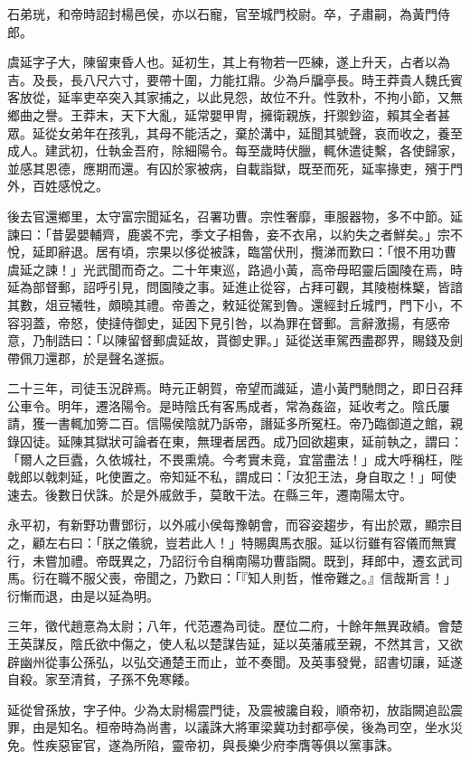 \begin{pinyinscope}
石弟珖，和帝時詔封楊邑侯，亦以石寵，官至城門校尉。卒，子肅嗣，為黃門侍郎。

虞延字子大，陳留東昏人也。延初生，其上有物若一匹練，遂上升天，占者以為吉。及長，長八尺六寸，要帶十圍，力能扛鼎。少為戶牖亭長。時王莽貴人魏氏賓客放從，延率吏卒突入其家捕之，以此見怨，故位不升。性敦朴，不拘小節，又無鄉曲之譽。王莽末，天下大亂，延常嬰甲冑，擁衛親族，扞禦鈔盜，賴其全者甚眾。延從女弟年在孩乳，其母不能活之，棄於溝中，延聞其號聲，哀而收之，養至成人。建武初，仕執金吾府，除細陽令。每至歲時伏臘，輒休遣徒繫，各使歸家，並感其恩德，應期而還。有囚於家被病，自載詣獄，既至而死，延率掾吏，殯于門外，百姓感悅之。

後去官還鄉里，太守富宗聞延名，召署功曹。宗性奢靡，車服器物，多不中節。延諫曰：「昔晏嬰輔齊，鹿裘不完，季文子相魯，妾不衣帛，以約失之者鮮矣。」宗不悅，延即辭退。居有頃，宗果以侈從被誅，臨當伏刑，攬涕而歎曰：「恨不用功曹虞延之諫！」光武聞而奇之。二十年東巡，路過小黃，高帝母昭靈后園陵在焉，時延為部督郵，詔呼引見，問園陵之事。延進止從容，占拜可觀，其陵樹株櫱，皆諳其數，俎豆犧牲，頗曉其禮。帝善之，敕延從駕到魯。還經封丘城門，門下小，不容羽蓋，帝怒，使撻侍御史，延因下見引咎，以為罪在督郵。言辭激揚，有感帝意，乃制誥曰：「以陳留督郵虞延故，貰御史罪。」延從送車駕西盡郡界，賜錢及劍帶佩刀還郡，於是聲名遂振。

二十三年，司徒玉況辟焉。時元正朝賀，帝望而識延，遣小黃門馳問之，即日召拜公車令。明年，遷洛陽令。是時陰氏有客馬成者，常為姦盜，延收考之。陰氏屢請，獲一書輒加篣二百。信陽侯陰就乃訴帝，譖延多所冤枉。帝乃臨御道之館，親錄囚徒。延陳其獄狀可論者在東，無理者居西。成乃回欲趨東，延前執之，謂曰：「爾人之巨蠹，久依城社，不畏熏燒。今考實未竟，宜當盡法！」成大呼稱枉，陛戟郎以戟刺延，叱使置之。帝知延不私，謂成曰：「汝犯王法，身自取之！」呵使速去。後數日伏誅。於是外戚斂手，莫敢干法。在縣三年，遷南陽太守。

永平初，有新野功曹鄧衍，以外戚小侯每豫朝會，而容姿趨步，有出於眾，顯宗目之，顧左右曰：「朕之儀貌，豈若此人！」特賜輿馬衣服。延以衍雖有容儀而無實行，未嘗加禮。帝既異之，乃詔衍令自稱南陽功曹詣闕。既到，拜郎中，遷玄武司馬。衍在職不服父喪，帝聞之，乃歎曰：「『知人則哲，惟帝難之。』信哉斯言！」衍慚而退，由是以延為明。

三年，徵代趙憙為太尉；八年，代范遷為司徒。歷位二府，十餘年無異政績。會楚王英謀反，陰氏欲中傷之，使人私以楚謀告延，延以英藩戚至親，不然其言，又欲辟幽州從事公孫弘，以弘交通楚王而止，並不奏聞。及英事發覺，詔書切讓，延遂自殺。家至清貧，子孫不免寒餧。

延從曾孫放，字子仲。少為太尉楊震門徒，及震被讒自殺，順帝初，放詣闕追訟震罪，由是知名。桓帝時為尚書，以議誅大將軍梁冀功封都亭侯，後為司空，坐水災免。性疾惡宦官，遂為所陷，靈帝初，與長樂少府李膺等俱以黨事誅。


\end{pinyinscope}
